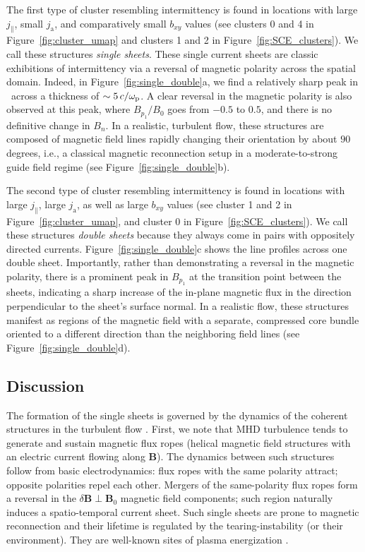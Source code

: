 The first type of cluster resembling intermittency is found in locations with large $j_\parallel$, small $j_\mathrm{a}$, and comparatively small $b_{xy}$ values (see clusters 0 and 4 in  Figure~\ref{fig:cluster_umap} and clusters 1 and 2 in Figure~\ref{fig:SCE_clusters}).
We call these structures \emph{single sheets}.
These single current sheets are classic exhibitions of intermittency via a reversal of magnetic polarity across the spatial domain.
Indeed, in Figure~\ref{fig:single_double}a, we find a relatively sharp peak in \jpar\ across a thickness of $\sim 5\,c/\omega_{\rm p}$.
A clear reversal in the magnetic polarity is also observed at this peak, where $B_{p_1}/B_0$ goes from $-0.5$ to $0.5$, and there is no definitive change in $B_n$.
In a realistic, turbulent flow, these structures are composed of magnetic field lines rapidly changing their orientation by about $90$ degrees, i.e., a classical magnetic reconnection setup in a moderate-to-strong guide field regime (see  Figure~\ref{fig:single_double}b).

The second type of cluster resembling intermittency is found in locations with large $j_\parallel$, large $j_\mathrm{a}$, as well as large $b_{xy}$ values (see cluster 1 and 2 in Figure~\ref{fig:cluster_umap}, and cluster 0 in Figure~\ref{fig:SCE_clusters}).
We call these structures \emph{double sheets} because they always come in pairs with oppositely directed currents.
Figure~\ref{fig:single_double}c shows the line profiles across one double sheet.
Importantly, rather than demonstrating a reversal in the magnetic polarity, there is a prominent peak in $B_{p_1}$ at the transition point between the sheets, indicating a sharp increase of the in-plane magnetic flux in the direction perpendicular to the sheet's surface normal.
In a realistic flow, these structures manifest as regions of the magnetic field with a separate, compressed core bundle oriented to a different direction than the neighboring field lines (see  Figure~\ref{fig:single_double}d).

\subsection{Discussion} \label{sec:plasma-discussion}
The formation of the single sheets is governed by the dynamics of the coherent structures in the turbulent flow \citep[e.g.,][]{zhou_spectrum_2023}.
First, we note that MHD turbulence tends to generate and sustain magnetic flux ropes (helical magnetic field structures with an electric current flowing along $\mathbf{B}$).
The dynamics between such structures follow from basic electrodynamics:
flux ropes with the same polarity attract;
opposite polarities repel each other.
Mergers of the same-polarity flux ropes form a reversal in the $\delta\mathbf{B} \perp \mathbf{B}_0$ magnetic field components;
such region naturally induces a spatio-temporal current sheet.
Such single sheets are prone to magnetic reconnection
\citep[e.g.,][]{priest_magnetic_2000,zweibel_magnetic_2009} and their lifetime is regulated by the tearing-instability \citep[e.g.,][]{comisso_interplay_2019} (or their environment).
They are well-known sites of plasma energization \citep{sironi_relativistic_2014, comisso_particle_2018}.

